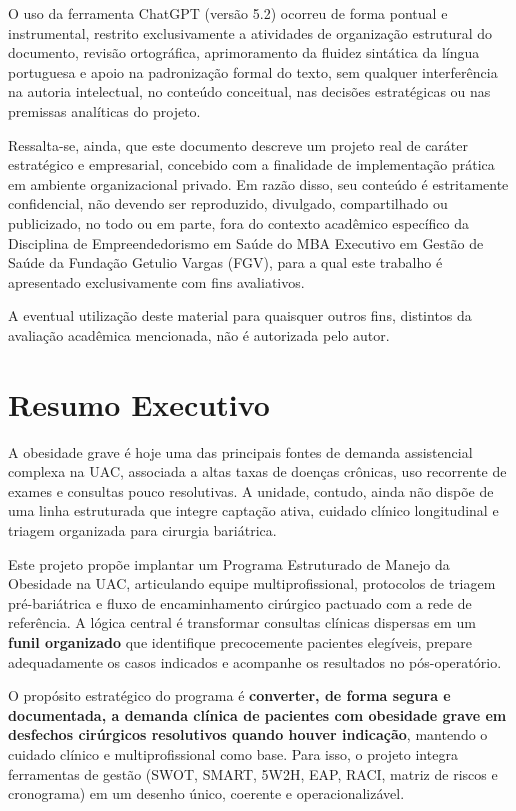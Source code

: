 \documentclass[12pt]{article}
\begin{document}
O uso da ferramenta ChatGPT (versão 5.2) ocorreu de forma pontual e instrumental, restrito exclusivamente a atividades de organização estrutural do documento, revisão ortográfica, aprimoramento da fluidez sintática da língua portuguesa e apoio na padronização formal do texto, sem qualquer interferência na autoria intelectual, no conteúdo conceitual, nas decisões estratégicas ou nas premissas analíticas do projeto.

Ressalta-se, ainda, que este documento descreve um projeto real de caráter estratégico e empresarial, concebido com a finalidade de implementação prática em ambiente organizacional privado. Em razão disso, seu conteúdo é estritamente confidencial, não devendo ser reproduzido, divulgado, compartilhado ou publicizado, no todo ou em parte, fora do contexto acadêmico específico da Disciplina de Empreendedorismo em Saúde do MBA Executivo em Gestão de Saúde da Fundação Getulio Vargas (FGV), para a qual este trabalho é apresentado exclusivamente com fins avaliativos.

A eventual utilização deste material para quaisquer outros fins, distintos da avaliação acadêmica mencionada, não é autorizada pelo autor.

\FGVNewPage

\section{Resumo Executivo}
\label{sec:org89e2524}
A obesidade grave é hoje uma das principais fontes de demanda assistencial complexa na UAC, associada a altas taxas de doenças crônicas, uso recorrente de exames e consultas pouco resolutivas. A unidade, contudo, ainda não dispõe de uma linha estruturada que integre captação ativa, cuidado clínico longitudinal e triagem organizada para cirurgia bariátrica.

Este projeto propõe implantar um Programa Estruturado de Manejo da Obesidade na UAC, articulando equipe multiprofissional, protocolos de triagem pré-bariátrica e fluxo de encaminhamento cirúrgico pactuado com a rede de referência. A lógica central é transformar consultas clínicas dispersas em um \textbf{funil organizado} que identifique precocemente pacientes elegíveis, prepare adequadamente os casos indicados e acompanhe os resultados no pós-operatório.

O propósito estratégico do programa é \textbf{converter, de forma segura e documentada, a demanda clínica de pacientes com obesidade grave em desfechos cirúrgicos resolutivos quando houver indicação}, mantendo o cuidado clínico e multiprofissional como base. Para isso, o projeto integra ferramentas de gestão (SWOT, SMART, 5W2H, EAP, RACI, matriz de riscos e cronograma) em um desenho único, coerente e operacionalizável.
\end{document}
